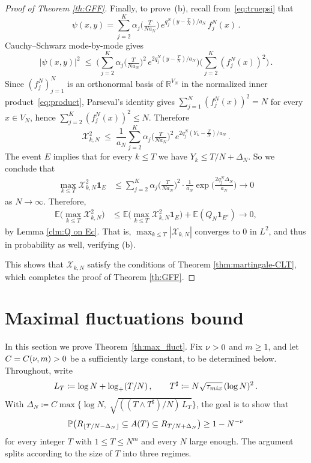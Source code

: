 \documentclass[11pt,a4paper,reqno]{amsart}
\theoremstyle{definition}
\newcommand{\cX}{\ensuremath{\mathcal X}}
\newcommand{\bbE}{{\ensuremath{\mathbb E}} }
\newcommand{\bbP}{{\ensuremath{\mathbb P}} }
\newcommand{\bbR}{{\ensuremath{\mathbb R}} }
\let\a=\alpha \let\b=\beta   \let\d=\delta  \let\e=\varepsilon
\begin{document}
\begin{proof}[Proof of Theorem \ref{th:GFF}]
Finally, to prove~(b), recall from~\eqref{eq:truepsi} that
$$ \psi(x, y) = \sum_{j=2}^K \a_j\!\big(\tfrac{T}{Na_N}\big)\, e^{q_j^N(y - \tfrac{T}{N} ) / a_N }  \, f_j^N(x)\,. $$
Cauchy--Schwarz mode-by-mode gives
$$ |\psi(x, y)|^2 \;\leq\; \Big(\sum_{j=2}^K \a_j\!\big(\tfrac{T}{Na_N}\big)^2 \, e^{2 q_j^N(y-\tfrac{T}{N} ) / a_N }\Big) \Big(\sum_{j=2}^K (f_j^N(x))^2\Big)\,. $$
Since $(f_j^N)_{j=1}^N$ is an orthonormal basis of $\bbR^{V_N}$ in the normalized inner product~\eqref{eq:product}, Parseval's identity gives $\sum_{j=1}^N (f_j^N(x))^2 = N$ for every $x \in V_N$, hence $\sum_{j=2}^K (f_j^N(x))^2 \leq N$. Therefore
$$ \cX_{k,N}^2 \;\leq\; \frac{1}{a_N} \sum_{j=2}^K \a_j\!\big(\tfrac{T}{Na_N}\big)^2 \, e^{2 q_j^N (Y_k - \tfrac{T}{N} ) / a_N }  \,. $$
The event $E$ implies that for every $k \leq T$ we have $Y_k \leq T/N + \Delta_N$. So we conclude that
\begin{align*}
\max_{k \leq T} \cX_{k,N}^2 \mathbf{1}_{E} & \leq \sum_{j=2}^K \alpha_j\!\big( \tfrac{T}{N a_N} \big)^2
\cdot \frac{1}{a_N} \exp \Big( \frac{2 q_j^N \Delta_N}{a_N}  \Big) \to 0
\end{align*}
as $N \to \infty$.
Therefore,
\begin{align*}
\bbE \big( \max_{k \leq T} \cX_{k,N}^2 \big) & \leq \bbE \big( \max_{k \leq T} \cX_{k,N}^2 \mathbf{1}_{E} \big) 
+ \bbE ( Q_N \mathbf{1}_{E^c} ) \to 0 ,
\end{align*}
by Lemma \ref{clm:Q on Ec}.  That is, $\max_{k \leq T} |\cX_{k,N}|$ converges to $0$ in $L^2$, and thus in probability as well, verifying (b).

This shows that $\cX_{k, N}$ satisfy the conditions of Theorem \ref{thm:martingale-CLT}, which completes 
the proof of Theorem \ref{th:GFF}.
\end{proof}




\medskip 

\section{Maximal fluctuations bound}\label{sec:max_fluct}
In this section we prove Theorem~\ref{th:max_fluct}. Fix $\nu > 0$ and $m \geq 1$, and let $C = C(\nu, m) > 0$ be a sufficiently large constant, to be determined below. Throughout, write
\[
  L_T \coloneqq \log N + \log_+(T/N)\,,\qquad
  T^\sharp \coloneqq N\sqrt{\tau_{mix}}\,(\log N)^2\,.
\]
With $\Delta_N \coloneqq C \max\!\big\{ \log N,\; \sqrt{((T \wedge T^\sharp)/N)\, L_T} \big\}$, the goal is to show that
\[
  \bbP\big( R_{\lfloor T/N - \Delta_N\rfloor} \subseteq A(T) \subseteq R_{T/N + \Delta_N}\big) \geq 1 - N^{-\n}
\]
for every integer $T$ with $1 \leq T \leq N^m$ and every $N$ large enough. The argument splits according to the size of $T$ into three regimes.
\end{document}
